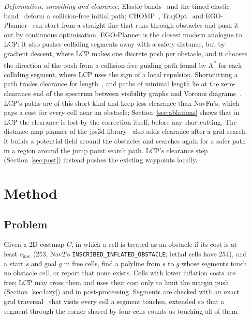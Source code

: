 \documentclass[conference]{IEEEtran}
\newcommand{\lcp}{LCP}
\begin{document}
\emph{Deformation, smoothing and clearance.} Elastic
bands~\cite{quinlan1993elastic} and the timed elastic band~\cite{rosmann2012teb,rosmann2017teb}
deform a collision-free initial path; CHOMP~\cite{ratliff2009chomp},
TrajOpt~\cite{schulman2014trajopt} and EGO-Planner~\cite{zhou2021ego} can start
from a straight line that runs through obstacles and push it out by continuous
optimisation. EGO-Planner is the closest modern analogue to \lcp{}: it also
pushes colliding segments away with a safety distance, but by gradient
descent, where \lcp{} makes one discrete push per obstacle, and it chooses the
direction of the push from a collision-free guiding path found by
A\textsuperscript{*} for each colliding segment, where \lcp{} uses the sign of a
local repulsion. Shortcutting a path
trades clearance for length~\cite{geraerts2007creating}, and paths of minimal
length lie at the zero-clearance end of the spectrum between visibility graphs and
Voronoi diagrams~\cite{wein2008planning}. \lcp{}'s paths are of this short kind
and keep less clearance than NavFn's, which pays a cost for every cell near an
obstacle; Section~\ref{sec:ablations} shows that in \lcp{} the clearance is lost
by the correction itself, before any shortcutting. The distance map planner of
the jps3d library~\cite{jps3d} also adds clearance after a grid search: it
builds a potential field around the obstacles and searches again for a safer
path in a region around the jump point search path. \lcp{}'s clearance step
(Section~\ref{sec:post}) instead pushes the existing waypoints locally.

\section{Method}
\label{sec:method}

\subsection{Problem}

Given a 2D costmap $C$, in which a cell is treated as an obstacle if its cost is at
least $c_\text{insc}$ (253, Nav2's \texttt{INSCRIBED\_INFLATED\_OBSTACLE}; lethal
cells have 254), and a start $s$ and goal $g$ in free cells, find a polyline from
$s$ to $g$ whose segments touch no obstacle cell, or report that none exists.
Cells with lower inflation costs are free; \lcp{} may cross them and uses their
cost only to limit the margin push (Section~\ref{sec:lazy}) and in post-processing. Segments are checked
with an exact grid traversal~\cite{amanatides1987fast} that visits every cell a
segment touches, extended so that a segment through the corner shared by four
cells counts as touching all of them.
\end{document}
